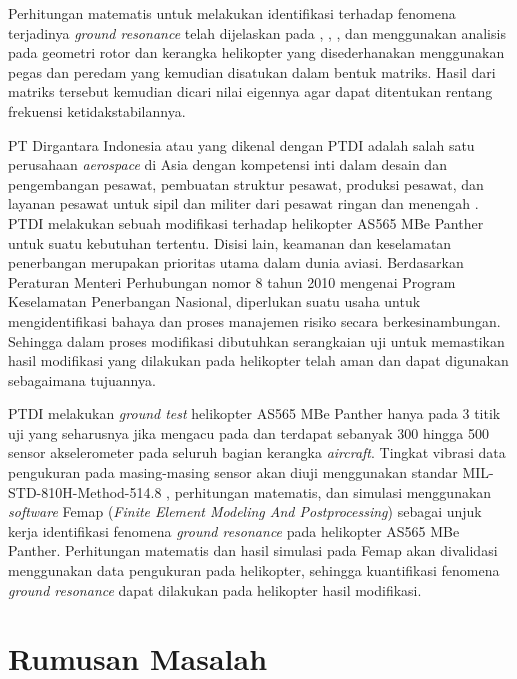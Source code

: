 Perhitungan matematis untuk melakukan identifikasi terhadap fenomena terjadinya \textit{ground resonance} telah dijelaskan pada \cite{Bergeot_passive}, \cite{BERGEOT201672}, \cite{borgesdasilva:hal-02188554}, dan \cite{DASIL} menggunakan analisis pada geometri rotor dan kerangka helikopter yang disederhanakan menggunakan pegas dan peredam yang kemudian disatukan dalam bentuk matriks. Hasil dari matriks tersebut kemudian dicari nilai eigennya agar dapat ditentukan rentang frekuensi ketidakstabilannya.

PT Dirgantara Indonesia atau yang dikenal dengan PTDI adalah salah satu perusahaan \textit{aerospace} di Asia dengan kompetensi inti dalam desain dan pengembangan pesawat, pembuatan struktur pesawat, produksi pesawat, dan layanan pesawat untuk sipil dan militer dari pesawat ringan dan menengah \cite{PTDI}. PTDI melakukan sebuah modifikasi terhadap helikopter AS565 MBe Panther untuk suatu kebutuhan tertentu. Disisi lain, keamanan dan keselamatan penerbangan merupakan prioritas utama dalam dunia aviasi. Berdasarkan Peraturan Menteri Perhubungan nomor 8 tahun 2010 mengenai Program Keselamatan Penerbangan Nasional, diperlukan suatu usaha untuk mengidentifikasi bahaya dan proses manajemen risiko secara berkesinambungan. Sehingga dalam proses modifikasi dibutuhkan serangkaian uji untuk memastikan hasil modifikasi yang dilakukan pada helikopter telah aman dan dapat digunakan sebagaimana tujuannya.

PTDI melakukan \textit{ground test} helikopter AS565 MBe Panther hanya pada 3 titik uji yang seharusnya jika mengacu pada \cite{Ciavarella2018AnEH} dan \cite{lubrina:hal-01059708} terdapat sebanyak 300 hingga 500 sensor akselerometer pada seluruh bagian kerangka \textit{aircraft}. Tingkat vibrasi data pengukuran pada masing-masing sensor akan diuji menggunakan standar MIL-STD-810H-Method-514.8 \cite{MILSTD}, perhitungan matematis, dan simulasi menggunakan \textit{software} Femap (\textit{Finite Element Modeling And Postprocessing}) sebagai unjuk kerja identifikasi fenomena \textit{ground resonance} pada helikopter AS565 MBe Panther. Perhitungan matematis dan hasil simulasi pada Femap akan divalidasi menggunakan data pengukuran pada helikopter, sehingga kuantifikasi fenomena \textit{ground resonance} dapat dilakukan pada helikopter hasil modifikasi.

\section{Rumusan Masalah}
\label{sec:rumusan masalah}

